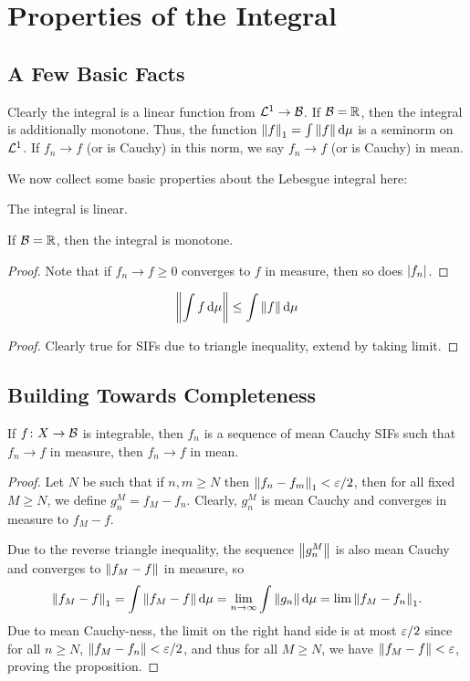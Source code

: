 \chapter{Properties of the Integral}

\section{A Few Basic Facts}

Clearly the integral is a linear function from $\mathcal L^1 \to \mathcal B$. If $\mathcal B = \mathbb R$, then the integral is additionally monotone. Thus, the function $\norm{f}_1 = \int \norm{f} \dd{\mu}$ is a seminorm on $\mathcal L^1$. If $f_n \to f$ (or is Cauchy) in this norm, we say $f_n \to f$ (or is Cauchy) in mean.

We now collect some basic properties about the Lebesgue integral here:

\begin{proposition}
    The integral is linear.
\end{proposition}

\begin{proposition}
    If $\mathcal B = \mathbb R$, then the integral is monotone.
\end{proposition}

\begin{proof}
    Note that if $f_n \to f \ge 0$ converges to $f$ in measure, then so does $\abs{f_n}$.
\end{proof}

\begin{proposition}
    \[\norm{\int f \dd{\mu}} \le \int \norm{f} \dd{\mu} \]
\end{proposition}

\begin{proof}
    Clearly true for SIFs due to triangle inequality, extend by taking limit.
\end{proof}

\section{Building Towards Completeness}
\begin{proposition}
    If $f \colon X \to \mathcal B$ is integrable, then $f_n$ is a sequence of mean Cauchy SIFs such that $f_n \to f$ in measure, then $f_n \to f$ in mean.
\end{proposition}

\begin{proof}
    Let $N$ be such that if $n, m \ge N$ then $\norm{f_n - f_m}_1 < \varepsilon/2$, then for all fixed $M \ge N$, we define $g_n^M = f_M - f_n$. Clearly, $g_n^M$ is mean Cauchy and converges in measure to $f_M - f$. 

    Due to the reverse triangle inequality, the sequence $\norm{g_n^M}$ is also mean Cauchy and converges to $\norm{f_M - f}$ in measure, so \[\norm{f_M - f}_1 = \int \norm{f_M - f} \dd{\mu} = \lim_{n \to \infty} \int \norm{g_n}\dd{\mu} = \lim \norm{f_M - f_n}_1.\] Due to mean Cauchy-ness, the limit on the right hand side is at most $\varepsilon/2$ since for all $n \ge N$, $\norm{f_M - f_n} < \varepsilon/2$, and thus for all $M \ge N$, we have $\norm{f_M - f} < \varepsilon$, proving the proposition.
\end{proof}

